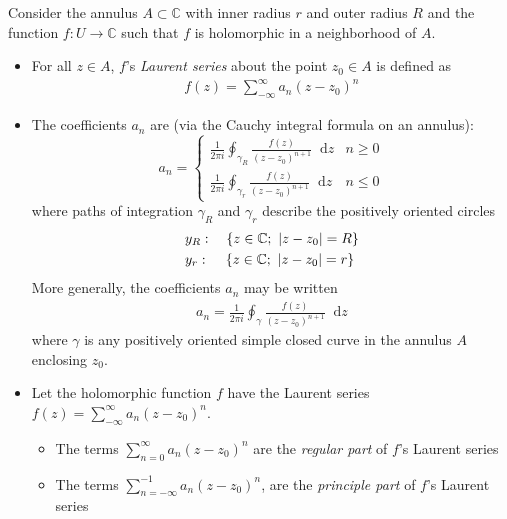 \documentclass[11pt, a4paper]{article}
\newcommand{\C}{\mathbb{C}} %
\newcommand{\diff}{\mathop{}\!\mathrm{d}} %
\begin{document}
Consider the annulus $ A \subset \C $ with inner radius $ r $ and outer radius $ R $ and the function $ f : U \to \C $ such that $ f $ is holomorphic in a neighborhood of $ A $. 
\begin{itemize}
	\item For all $ z \in A $, $ f $'s \textit{Laurent series} about the point $ z_0 \in A $ is defined as
	\begin{align*}
		f(z) = \sum_{-\infty}^{\infty} a_n (z - z_0)^{n}
	\end{align*}
	
	\item The coefficients $ a_n $ are (via the Cauchy integral formula on an annulus):
	\[
		a_n = 
		\begin{cases}
			\displaystyle{\frac{1}{2\pi i} \oint_{\gamma_R} \frac{f(z)}{(z - z_0)^{n+1}}\diff z} & n \geq 0 \\[5.0mm]
			\displaystyle{	\frac{1}{2\pi i} \oint_{\gamma_r} \frac{f(z)}{(z - z_0)^{n+1}}\diff z} & n \leq 0
		\end{cases}
	\]
	where paths of integration $ \gamma_R $ and $ \gamma_r $ describe the positively oriented circles
	\begin{align*}
		&y_R: \quad \left\{z \in \C; \ \abs{z - z_0} = R \right\}\\
		&y_r: \quad \, \left\{z \in \C; \ \abs{z - z_0} = r \right\}
	\end{align*}
	More generally, the coefficients $ a_n $ may be written
	\begin{align*}
		a_n = \frac{1}{2\pi i} \oint_{\gamma} \frac{f(z)}{(z - z_0)^{n+1}}\diff z
	\end{align*}
	where $ \gamma $ is any positively oriented simple closed curve in the annulus $ A $ enclosing $ z_0 $.
	
	\item Let the holomorphic function $ f $ have the Laurent series $ \displaystyle{f(z) = \sum_{-\infty}^{\infty} a_n (z - z_0)^{n}} $.
	\vspace{-5mm}
	\begin{itemize}
		\item The terms $ \displaystyle{\sum_{n=0}^{\infty} a_n (z - z_0)^{n}} $ are the \textit{regular part} of $ f $'s Laurent series
		
		\item The terms $ \displaystyle{	\sum_{n=-\infty}^{-1} a_n (z - z_0)^{n}} $, are the \textit{principle part} of $ f $'s Laurent series
	\end{itemize}
	

\end{itemize}
\end{document}
